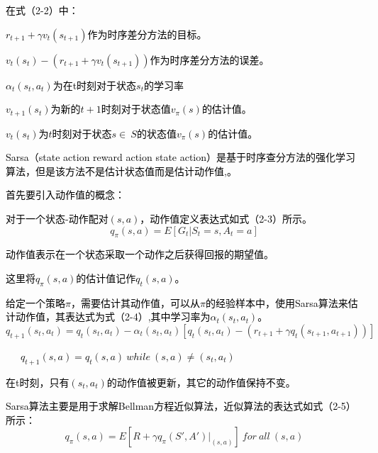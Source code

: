 \textcolor{black}{在式（2-2）中：}

\textcolor{black}{$r_{t+1}+\gamma v_{t}(s_{t+1})$作为时序差分方法的目标。}

\textcolor{black}{$v_{t}(s_{t})-(r_{t+1}+\gamma v_{t}(s_{t+1}))$作为时序差分方法的误差。}

\textcolor{black}{$\alpha_{t}(s_{t},a_{t})$为在{t}时刻对于状态$s_{t}$的学习率}

\textcolor{black}{$v_{t+1}(s_{t})$为新的$t+1$时刻对于状态值$v_{\pi}(s)$的估计值。}

\textcolor{black}{$v_{t}(s_{t})$为$t$时刻对于状态$s\in\ S$的状态值$v_{\pi}(s)$的估计值。}

\textcolor{black}{Sarsa（state action reward action state action）是基于时序查分方法的强化学习算法，但是该方法不是估计状态值而是估计动作值\parencite{ref29},\parencite{ref30}。}

\textcolor{black}{首先要引入动作值的概念：}

\textcolor{black}{对于一个状态-动作配对${(s,a)}$，动作值定义表达式如式（2-3）所示。}
\begin{equation}
q_{\pi}\left({s,a}\right)={E}\left[\left.{G}_{t}\right|{S}_{t}{=s,} {A}_{t}{=a} \right] 
\end{equation}

\textcolor{black}{动作值表示在一个状态采取一个动作之后获得回报的期望值。}

\textcolor{black}{这里将${q}_{\pi}\left({s,a}\right)$的估计值记作${q}_{t}\left({s,a}\right)$。}

\textcolor{black}{给定一个策略$\pi$，需要估计其动作值，可以从$\pi$的经验样本中，使用Sarsa算法来估计动作值，其表达式为式（2-4）,其中学习率为$\alpha _{t}(s_{t},a_{t})$。}
\begin{equation}
q_{t+1}(s_{t},a_{t})=q_{t}(s_{t},a_{t})-\alpha _{t}(s_{t},a_{t})[q_{t}(s_{t},a_{t})-(r_{t+1}+\gamma q_{t}(s_{t+1},a_{t+1}))]    
\end{equation}

\textcolor{black}{\ \ \ $q_{t+1}(s,a)=q_{t}(s,a) \ while \ (s,a) \neq (s_{t},a_{t})$}

\textcolor{black}{在t时刻，只有$\left({s}_{t}{,} {a}_{t}\right)$的动作值被更新，其它的动作值保持不变。}

\textcolor{black}{Sarsa算法主要是用于求解Bellman方程近似算法，近似算法的表达式如式（2-5）所示：}
\begin{equation}
{q}_{\pi}({s,a}){=E}[R+\gamma q_{\pi}(S',A')|_{(s,a)}] \ for \ all \ (s,a) 
\end{equation}


